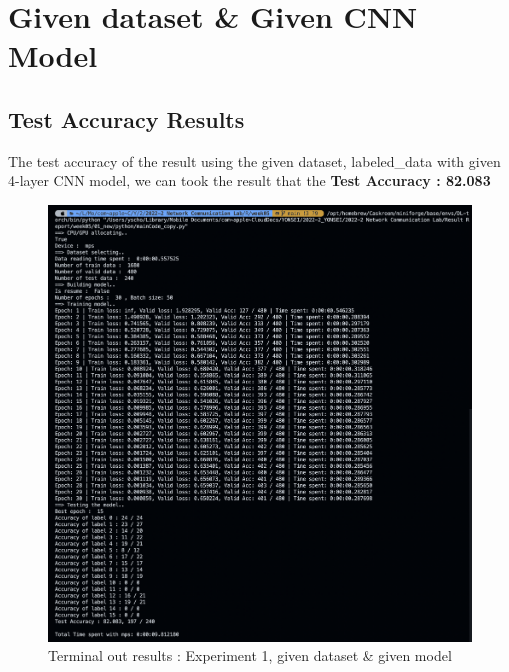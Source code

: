 \section{Given dataset \& Given CNN Model}
\subsection{Test Accuracy Results}
The test accuracy of the result using the given dataset, labeled\_data with given 4-layer CNN model, we can took the result that the \textbf{Test Accuracy : 82.083}\\
    \vspace{-4mm}  
    \begin{figure}[!h]\centering 
		\includegraphics[width=.95\textwidth]{image/week05/1-1.png}
		\caption{\footnotesize 
		Terminal out results : Experiment 1, given dataset \& given model}
		\vspace{-10pt}
    \end{figure}
